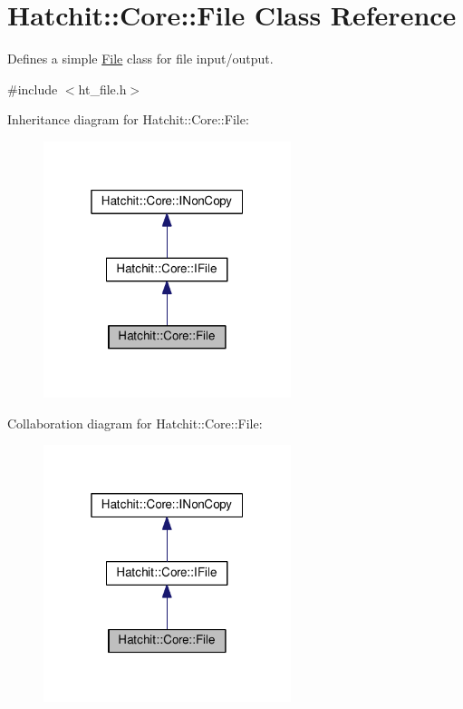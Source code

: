 \hypertarget{classHatchit_1_1Core_1_1File}{}\section{Hatchit\+:\+:Core\+:\+:File Class Reference}
\label{classHatchit_1_1Core_1_1File}


Defines a simple \hyperlink{classHatchit_1_1Core_1_1File}{File} class for file input/output.  




{\ttfamily \#include $<$ht\+\_\+file.\+h$>$}



Inheritance diagram for Hatchit\+:\+:Core\+:\+:File\+:
\nopagebreak
\begin{figure}[H]
\begin{center}
\leavevmode
\includegraphics[width=205pt]{classHatchit_1_1Core_1_1File__inherit__graph}
\end{center}
\end{figure}


Collaboration diagram for Hatchit\+:\+:Core\+:\+:File\+:
\nopagebreak
\begin{figure}[H]
\begin{center}
\leavevmode
\includegraphics[width=205pt]{classHatchit_1_1Core_1_1File__coll__graph}
\end{center}
\end{figure}
